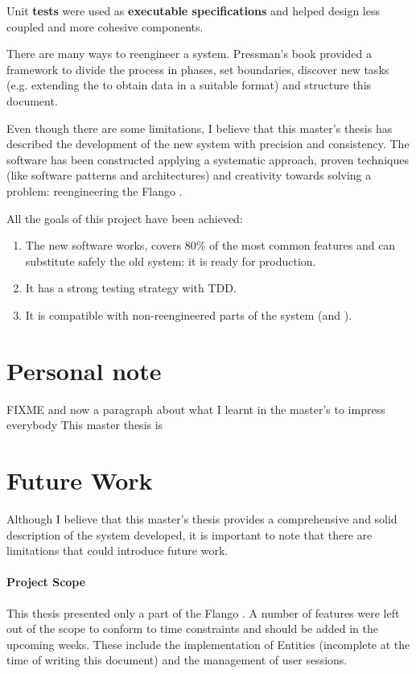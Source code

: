 Unit \textbf{tests} were used as \textbf{executable specifications} and helped design less coupled and more cohesive components.

There are many ways to reengineer a system.
Pressman's book provided a framework to divide the process in phases, set boundaries, discover new tasks (e.g. extending the \flangobe to obtain data in a suitable format) and structure this document.

Even though there are some limitations, I believe that this master's thesis has described the development of the new system with precision and consistency.
The software has been constructed applying a systematic approach, proven techniques (like software patterns and architectures) and creativity towards solving a problem: reengineering the Flango \cm .

All the goals of this project have been achieved:
\begin{enumerate}
\item The new software works, covers 80\% of the most common features and can substitute safely the old \flash system: it is ready for production.
\item It has a strong testing strategy with \ac{TDD}.
\item It is compatible with non-reengineered parts of the system (\flangobe and \flangofe).
\end{enumerate}


\section{Personal note}
FIXME and now a paragraph about what I learnt in the master's to impress everybody
This master thesis is 


\section{Future Work}
Although I believe that this master's thesis provides a comprehensive and solid description of the system developed, it is important to note that there are limitations that could introduce future work.

\paragraph{Project Scope} This thesis presented only a part of the Flango \cm . 
A number of features were left out of the scope to conform to time constraints and should be added in the upcoming weeks.
These include the implementation of Entities (incomplete at the time of writing this document) and the management of user sessions.

